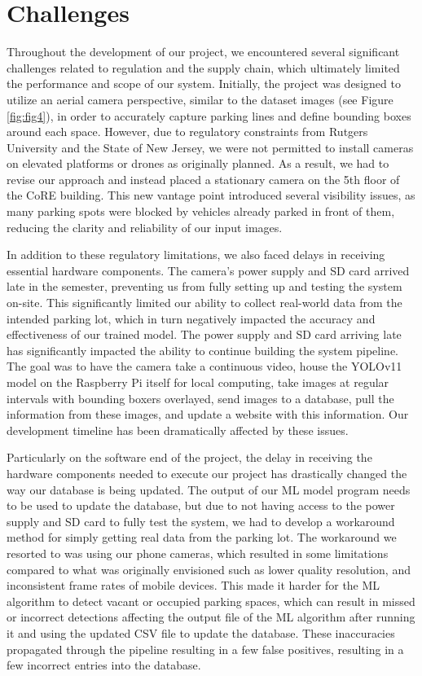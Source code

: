 \documentclass[conference]{IEEEtran}
\begin{document}
\section{Challenges}
Throughout the development of our project, 
we encountered several significant challenges related to regulation and the supply chain, 
which ultimately limited the performance and scope of our system. 
Initially, 
the project was designed to utilize an aerial camera perspective, 
similar to the dataset images 
(see Figure \ref{fig:fig4}), 
in order to accurately capture parking lines and define bounding boxes around each space. 
However, 
due to regulatory constraints from Rutgers University and the State of New Jersey, 
we were not permitted to install cameras on elevated platforms or drones as originally planned. 
As a result, 
we had to revise our approach and instead placed a stationary camera on the 5th floor of the CoRE building. 
This new vantage point introduced several visibility issues, 
as many parking spots were blocked by vehicles already parked in front of them, 
reducing the clarity and reliability of our input images. 

In addition to these regulatory limitations, 
we also faced delays in receiving essential hardware components. 
The camera's power supply and SD card arrived late in the semester, 
preventing us from fully setting up and testing the system on-site. 
This significantly limited our ability to collect real-world data from the intended parking lot, 
which in turn negatively impacted the accuracy and effectiveness of our trained model. 
The power supply and SD card arriving late has significantly impacted the ability to continue building the system pipeline. 
The goal was to have the camera take a continuous video, 
house the YOLOv11 model on the Raspberry Pi itself for local computing, 
take images at regular intervals with bounding boxers overlayed, 
send images to a database, 
pull the information from these images, 
and update a website with this information. 
Our development timeline has been dramatically affected by these issues.

Particularly on the software end of the project, 
the delay in receiving the hardware components needed to execute our project has drastically changed the way our database is being updated. 
The output of our ML model program needs to be used to update the database, 
but due to not having access to the power supply and SD card to fully test the system, 
we had to develop a workaround method for simply getting real data from the parking lot. 
The workaround we resorted to was using our phone cameras, 
which resulted in some limitations compared to what was originally envisioned such as lower quality resolution, 
and inconsistent frame rates of mobile devices. 
This made it harder for the ML algorithm to detect vacant or occupied parking spaces, 
which can result in missed or incorrect detections affecting the output file of the ML algorithm after running it and using the updated CSV file to update the database. 
These inaccuracies propagated through the pipeline resulting in a few false positives, 
resulting in a few incorrect entries into the database. 
\end{document}
